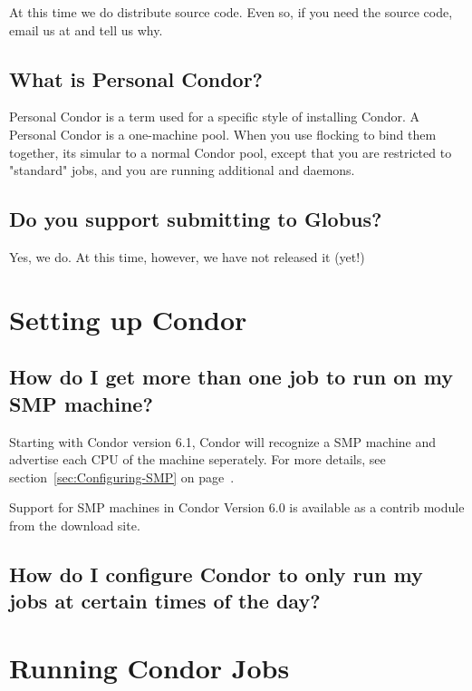 At this time we do  distribute source code.
Even so, if you need the source code, email us at  and tell us why.

\subsection{What is Personal Condor?}

Personal Condor is a term used for a specific style of installing Condor.
A Personal Condor is a one-machine pool.  When you use flocking to bind
them together, its simular to a normal Condor pool, except that you are restricted
to "standard" jobs, and you are running additional  and  
daemons.

\subsection{Do you support submitting to Globus?}

Yes, we do.  At this time, however, we have not released it (yet!)



\section{Setting up Condor}


\subsection{How do I get more than one job to run on my SMP machine?}

Starting with Condor version 6.1, Condor will recognize a SMP machine and advertise each CPU of the
machine seperately.  For more details, see section~\ref{sec:Configuring-SMP} on page~\pageref{sec:Configuring-SMP}.

Support for SMP machines in Condor Version 6.0 is available as a contrib module from the download site.

\subsection{How do I configure Condor to only run my jobs at certain times of the day?}

\Todo



\section{Running Condor Jobs}


